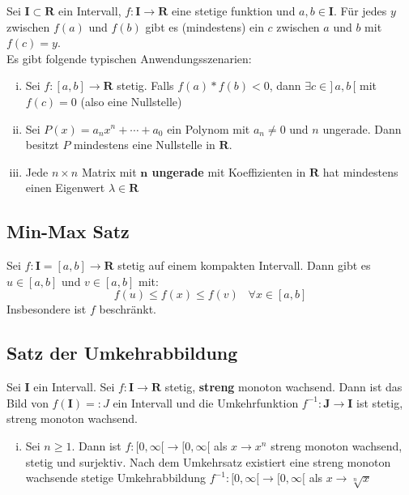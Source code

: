 \documentclass[8pt]{article}
\begin{document}
\begin{multicols*}{3}
Sei $\mathbf{I} \subset \mathbf{R}$ ein Intervall, $f:\mathbf{I} \rightarrow \mathbf{R}$ eine
stetige funktion und $a, b \in \mathbf{I}$. Für jedes $y$ zwischen $f(a)$ und $f(b)$
gibt es (mindestens) ein $c$ zwischen $a$ und $b$ mit $f(c) = y$.\\
Es gibt folgende typischen Anwendungsszenarien:
\begin{enumerate}[(i)]
  \item Sei $f:[a, b] \rightarrow \mathbf{R}$ stetig. Falls $f(a)*f(b) < 0$, dann
  $\exists c \in ]\,a, b\,[$ mit $f(c) = 0$ (also eine Nullstelle)
  \item Sei $P(x) = a_nx^n + \cdots + a_0$ ein Polynom mit $a_n \neq 0$ und $n$ ungerade.
  Dann besitzt $P$ mindestens eine Nullstelle in $\mathbf{R}$.
  \item Jede $n \times n$ Matrix mit \textbf{$\boldsymbol{n}$ ungerade} mit Koeffizienten in $\mathbf{R}$ hat mindestens
  einen Eigenwert $\lambda \in \mathbf{R}$
\end{enumerate}

\subsection{Min-Max Satz}

Sei $f:\mathbf{I}=[a, b] \rightarrow \mathbf{R}$ stetig auf einem kompakten Intervall.
Dann gibt es $u \in [a, b]$ und $v \in [a, b]$ mit:
$$
  f(u) \leq f(x) \leq f(v) \;\;\; \forall x \in [a, b]
$$
Insbesondere ist $f$ beschränkt.

\subsection{Satz der Umkehrabbildung}

Sei $\mathbf{I}$ ein Intervall. Sei $f:\mathbf{{I} \rightarrow \mathbf{R}}$ stetig, \textbf{streng} monoton
wachsend. Dann ist das Bild von $f(\mathbf{I}) =: J$ ein Intervall und die Umkehrfunktion
$f^{-1}: \mathbf{J} \rightarrow \mathbf{I}$ ist stetig, streng monoton wachsend.
\begin{enumerate}[(i)]
  \item Sei $n \geq 1$. Dann ist $f:[0, \infty[ \rightarrow [0, \infty[$ als $x \rightarrow x^n$
  streng monoton wachsend, stetig und surjektiv. Nach dem Umkehrsatz existiert eine streng monoton
  wachsende stetige Umkehrabbildung $f^{-1}:[0, \infty[ \rightarrow [0, \infty[$ als $x \rightarrow \sqrt[n]{x}$
\end{enumerate}


\end{multicols*}
\end{document}
